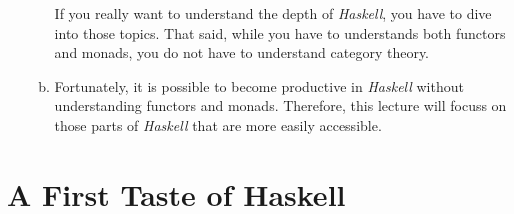 \begin{enumerate}
\begin{enumerate}[(a)]
        If you really want to understand the depth of \textsl{Haskell}, you have to dive into those topics.
        That said, while you have to understands both functors and monads, you do not have to understand
        category theory.
  \item Fortunately, it is possible to become productive in \textsl{Haskell} without understanding 
        functors and monads.  Therefore, this lecture will focuss on those parts of \textsl{Haskell} that are more easily
        accessible. 
  \end{enumerate}
\end{enumerate}

\section{A First Taste of Haskell}
